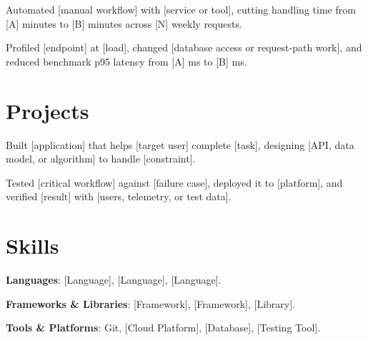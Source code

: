 \documentclass{resume}
\begin{document}
\begin{jobduties}
  \item Automated [manual workflow] with [service or tool], cutting handling time from [A] minutes to [B] minutes across [N] weekly requests.
  \item Profiled [endpoint] at [load], changed [database access or request-path work], and reduced benchmark p95 latency from [A] ms to [B] ms.
\end{jobduties}

\section{Projects}

\begin{jobduties}
  \item Built [application] that helps [target user] complete [task], designing [API, data model, or algorithm] to handle [constraint].
  \item Tested [critical workflow] against [failure case], deployed it to [platform], and verified [result] with [users, telemetry, or test data].
\end{jobduties}

\section{Skills}
\begin{skillitems}
  \item \textbf{Languages}: [Language], [Language], [Language].
  \item \textbf{Frameworks \& Libraries}: [Framework], [Framework], [Library].
  \item \textbf{Tools \& Platforms}: Git, [Cloud Platform], [Database], [Testing Tool].
\end{skillitems}
\end{document}
